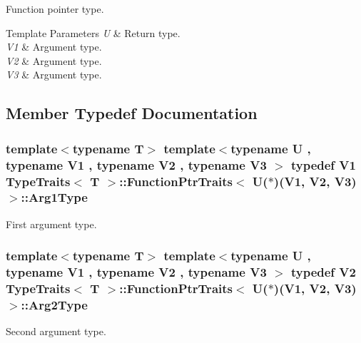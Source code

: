 Function pointer type. 
\begin{DoxyTemplParams}{Template Parameters}
{\em U} & Return type. \\
\hline
{\em V1} & Argument type. \\
\hline
{\em V2} & Argument type. \\
\hline
{\em V3} & Argument type. \\
\hline
\end{DoxyTemplParams}


\subsection{Member Typedef Documentation}
\subsubsection[{\texorpdfstring{Arg1\+Type}{Arg1Type}}]{\setlength{\rightskip}{0pt plus 5cm}template$<$typename T$>$ template$<$typename U , typename V1 , typename V2 , typename V3 $>$ typedef V1 {\bf Type\+Traits}$<$ T $>$\+::{\bf Function\+Ptr\+Traits}$<$ U($\ast$)(V1, V2, V3)$>$\+::{\bf Arg1\+Type}}\hypertarget{structTypeTraits_1_1FunctionPtrTraits_3_01U_07_5_08_07V1_00_01V2_00_01V3_08_4_aedbbbc4cf520ca916604118428257ae9}{}\label{structTypeTraits_1_1FunctionPtrTraits_3_01U_07_5_08_07V1_00_01V2_00_01V3_08_4_aedbbbc4cf520ca916604118428257ae9}
First argument type. 
\subsubsection[{\texorpdfstring{Arg2\+Type}{Arg2Type}}]{\setlength{\rightskip}{0pt plus 5cm}template$<$typename T$>$ template$<$typename U , typename V1 , typename V2 , typename V3 $>$ typedef V2 {\bf Type\+Traits}$<$ T $>$\+::{\bf Function\+Ptr\+Traits}$<$ U($\ast$)(V1, V2, V3)$>$\+::{\bf Arg2\+Type}}\hypertarget{structTypeTraits_1_1FunctionPtrTraits_3_01U_07_5_08_07V1_00_01V2_00_01V3_08_4_a6a3b9b4a2ddab27b80a63da3b2ae1183}{}\label{structTypeTraits_1_1FunctionPtrTraits_3_01U_07_5_08_07V1_00_01V2_00_01V3_08_4_a6a3b9b4a2ddab27b80a63da3b2ae1183}
Second argument type. 

